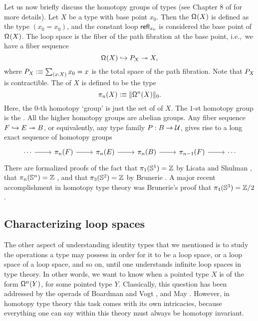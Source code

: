 \documentclass[reqno]{amsart}
\begin{document}
Let us now briefly discuss the homotopy groups of types (see Chapter 8 of \cite{hottbook} for more details).
Let $X$ be a type with base point $x_0$. Then the  $\loopspace{X}$ is
defined as the type $(x_0=x_0)$, and the constant loop $\refl{x_0}$
is considered the base point of $\loopspace{X}$. The loop space is the fiber
of the path fibration at the base point, i.e.,~we have a fiber sequence
\begin{equation*}
\loopspace{X}\hookrightarrow \totalpath{X} \fibration X,
\end{equation*}
where $\totalpath{X}\defeq\sm{x:X}x_0=x$ is the total space of the path fibration.
Note that $\totalpath{X}$ is contractible. The  of $X$ is
defined to be the type
\begin{equation*}
\pi_n(X)\defeq \trunc{0}{\loopspace[n]{X}}.
\end{equation*}
Here, the $0$-th homotopy `group' is just the set of  of $X$. The
$1$-st homotopy group is the . All the higher homotopy groups
are abelian groups. Any fiber sequence $F\hookrightarrow E\fibration B$, or equivalently, any type family $P:B\to\UU$, gives rise to a long exact sequence of homotopy groups
\begin{equation*}
\begin{tikzcd}
\cdots \arrow[r] & \pi_n(F) \arrow[r] & \pi_n(E) \arrow[r] & \pi_n(B) \arrow[r] & \pi_{n-1}(F) \arrow[r] & \cdots
\end{tikzcd}
\end{equation*}
There are formalized proofs of the fact that $\pi_1(\sphere{1})=\Z$
by Licata and Shulman \cite{LicataShulman}, that $\pi_n(\sphere{n})=\Z$ \cite{hottbook}, and that $\pi_3(\sphere{2})=\Z$ by Brunerie \cite{hottbook}.
A major recent accomplishment in homotopy type theory was Brunerie's proof that $\pi_4(\sphere{3})=\Z/2$ \cite{Brunerie16}. 

\subsection{Characterizing loop spaces}
The other aspect of understanding identity types that we mentioned is to study the operations a type may
possess in order for it to be a loop space, or a loop space of a loop space, and so on,
until one understands infinite loop spaces in type theory. In other words,
we want to know when a pointed type $X$ is of the form $\loopspace[n]{Y}$, for
some pointed type $Y$.
Classically, this question has been addressed by the operads
of Boardman and Vogt \cite{BoardmanVogt}, and May \cite{May72}. 
However, in homotopy type theory this task comes with
its own intricacies, because everything one can say within this theory must
always be homotopy invariant. 
\end{document}
